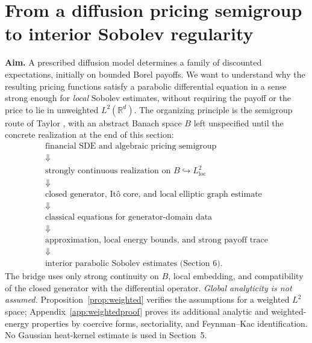 \documentclass[11pt,a4paper]{article}
\theoremstyle{definition}\newtheorem{definition}{Definition}[section]\newtheorem{example}[theorem]{Example}
\theoremstyle{remark}\newtheorem{remark}[theorem]{Remark}\newtheorem{remarkSix}{Remark}[section]
\newcommand{\Rd}{\mathbb R^d}
\newcommand{\loc}{\mathrm{loc}}
\begin{document}
\section{From a diffusion pricing semigroup to interior Sobolev regularity}
\label{sec:Bsemigroup}

\noindent\textbf{Aim.}
A prescribed diffusion model determines a family of discounted expectations, initially on bounded Borel payoffs. We want to understand why the resulting pricing functions satisfy a parabolic differential equation in a sense strong enough for \emph{local} Sobolev estimates, without requiring the payoff or the price to lie in unweighted $L^2(\Rd)$. The organizing principle is the semigroup route of Taylor \cite[Vol.~II, Ch.~11, \S10]{taylorII}, with an abstract Banach space $B$ left unspecified until the concrete realization at the end of this section:
\begin{equation}\label{eq:routeB}
\boxed{\begin{gathered}
\text{financial SDE and algebraic pricing semigroup}\\
\Downarrow\\[-2pt]
\text{strongly continuous realization on }B\hookrightarrow L^2_{\loc}\\
\Downarrow\\[-2pt]
\text{closed generator, It\^o core, and local elliptic graph estimate}\\
\Downarrow\\[-2pt]
\text{classical equations for generator-domain data}\\
\Downarrow\\[-2pt]
\text{approximation, local energy bounds, and strong payoff trace}\\
\Downarrow\\[-2pt]
\text{interior parabolic Sobolev estimates (Section~6).}
\end{gathered}}
\end{equation}
The bridge uses only strong continuity on $B$, local embedding, and compatibility of the closed generator with the differential operator. \emph{Global analyticity is not assumed.} Proposition~\ref{prop:weighted} verifies the assumptions for a weighted $L^2$ space; Appendix~\ref{app:weightedproof} proves its additional analytic and weighted-energy properties by coercive forms, sectoriality, and Feynman--Kac identification. No Gaussian heat-kernel estimate is used in Section~5.
\end{document}
